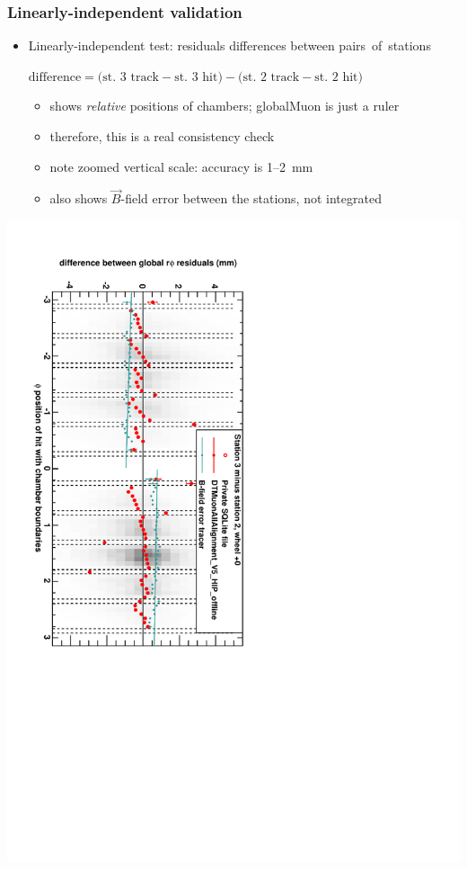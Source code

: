 \documentclass[compress]{beamer}
\begin{document}
\begin{frame}
\frametitle{Linearly-independent validation}

\begin{itemize}
\item Linearly-independent test: residuals differences between
  \mbox{pairs of stations\hspace{-1 cm}}

\mbox{$\mbox{difference} = \big(\mbox{st.\ 3 track} - \mbox{st.\ 3 hit}\big) - \big(\mbox{st.\ 2 track} - \mbox{st.\ 2 hit}\big)$}

\begin{itemize}\setlength{\itemsep}{0.1 cm}
\item shows {\it relative} positions of chambers; globalMuon is just a ruler
\item therefore, this is a real consistency check
\item note zoomed vertical scale: accuracy is 1--2~mm
\item also shows $\vec{B}$-field error between the stations, not integrated
\end{itemize}
\end{itemize}

\vspace{-0.4 cm}
\begin{center}
\includegraphics[height=0.95\linewidth, angle=90]{summary_DTrphidiff23VsPhi_whC.pdf}
\end{center}
\end{frame}
\end{document}
